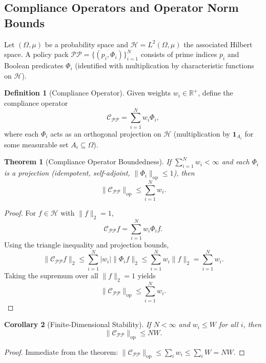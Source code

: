 \documentclass[12pt,letterpaper]{article}
\theoremstyle{definition}
\newtheorem{definition}{Definition}[section]
\theoremstyle{plain}
\newtheorem{theorem}{Theorem}[section]
\newtheorem{corollary}[theorem]{Corollary}
\theoremstyle{remark}
\begin{document}
\subsection{Compliance Operators and Operator Norm Bounds}
\label{subsec:comp-ops}

Let \((\Omega, \mu)\) be a probability space and \(\mathcal{H} = L^2(\Omega, \mu)\) the associated Hilbert space. A policy pack \(\mathcal{PP} = \{(p_i, \Phi_i)\}_{i=1}^N\) consists of prime indices \(p_i\) and Boolean predicates \(\Phi_i\) (identified with multiplication by characteristic functions on \(\mathcal{H}\)).

\begin{definition}[Compliance Operator]
Given weights \(w_i \in \mathbb{R}^+\), define the compliance operator
\[
\mathcal{C}_{\mathcal{PP}} = \sum_{i=1}^N w_i \Phi_i,
\]
where each \(\Phi_i\) acts as an orthogonal projection on \(\mathcal{H}\) (multiplication by \(\mathbf{1}_{A_i}\) for some measurable set \(A_i \subseteq \Omega\)).
\end{definition}

\begin{theorem}[Compliance Operator Boundedness]
If \(\sum_{i=1}^N w_i < \infty\) and each \(\Phi_i\) is a projection (idempotent, self-adjoint, \(\|\Phi_i\|_{\mathrm{op}} \le 1\)), then
\[
\|\mathcal{C}_{\mathcal{PP}}\|_{\mathrm{op}} \le \sum_{i=1}^N w_i.
\]
\end{theorem}

\begin{proof}
For \(f \in \mathcal{H}\) with \(\|f\|_2 = 1\),
\[
\mathcal{C}_{\mathcal{PP}} f = \sum_{i=1}^N w_i \Phi_i f.
\]
Using the triangle inequality and projection bounds,
\[
\|\mathcal{C}_{\mathcal{PP}} f\|_2 \le \sum_{i=1}^N |w_i| \|\Phi_i f\|_2 \le \sum_{i=1}^N w_i \|f\|_2 = \sum_{i=1}^N w_i.
\]
Taking the supremum over all \(\|f\|_2 = 1\) yields
\[
\|\mathcal{C}_{\mathcal{PP}}\|_{\mathrm{op}} \le \sum_{i=1}^N w_i.
\]
\end{proof}

\begin{corollary}[Finite-Dimensional Stability]
If \(N < \infty\) and \(w_i \le W\) for all \(i\), then
\[
\|\mathcal{C}_{\mathcal{PP}}\|_{\mathrm{op}} \le N W.
\]
\end{corollary}

\begin{proof}
Immediate from the theorem:
\(\|\mathcal{C}_{\mathcal{PP}}\|_{\mathrm{op}} \le \sum_i w_i \le \sum_i W = N W.\)
\end{proof}
\end{document}
